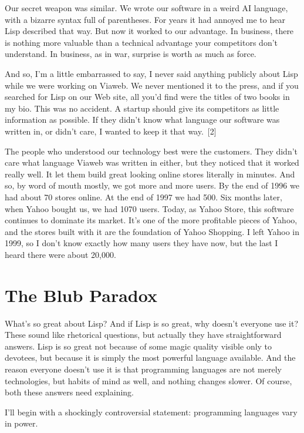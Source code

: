 \documentclass[10pt,twoside,openright]{memoir}
\begin{document}
Our secret weapon was similar. We wrote our software in a weird AI language, with a bizarre syntax full of parentheses. For years it had annoyed me to hear Lisp described that way. But now it worked to our advantage. In business, there is nothing more valuable than a technical advantage your competitors don't understand. In business, as in war, surprise is worth as much as force.

And so, I'm a little embarrassed to say, I never said anything publicly about Lisp while we were working on Viaweb. We never mentioned it to the press, and if you searched for Lisp on our Web site, all you'd find were the titles of two books in my bio. This was no accident. A startup should give its competitors as little information as possible. If they didn't know what language our software was written in, or didn't care, I wanted to keep it that way.~[2]

The people who understood our technology best were the customers. They didn't care what language Viaweb was written in either, but they noticed that it worked really well. It let them build great looking online stores literally in minutes. And so, by word of mouth mostly, we got more and more users. By the end of 1996 we had about 70 stores online. At the end of 1997 we had 500. Six months later, when Yahoo bought us, we had 1070 users. Today, as Yahoo Store, this software continues to dominate its market. It's one of the more profitable pieces of Yahoo, and the stores built with it are the foundation of Yahoo Shopping. I left Yahoo in 1999, so I don't know exactly how many users they have now, but the last I heard there were about 20,000.

\section{The Blub Paradox}

What's so great about Lisp? And if Lisp is so great, why doesn't everyone use it? These sound like rhetorical questions, but actually they have straightforward answers. Lisp is so great not because of some magic quality visible only to devotees, but because it is simply the most powerful language available. And the reason everyone doesn't use it is that programming languages are not merely technologies, but habits of mind as well, and nothing changes slower. Of course, both these answers need explaining.

I'll begin with a shockingly controversial statement: programming languages vary in power.
\end{document}
